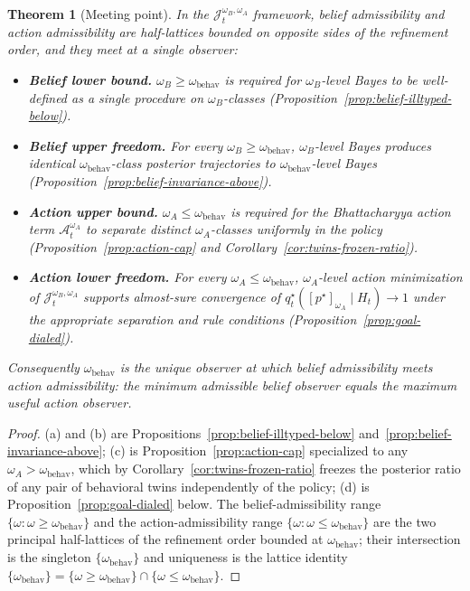 \documentclass[11pt]{article}
\newtheorem{theorem}{Theorem}[section]
\theoremstyle{definition}
\theoremstyle{remark}
\begin{document}
\begin{theorem}[Meeting point]
\label{thm:meeting-point}
In the $\mathcal J_t^{\omega_B,\omega_A}$ framework, belief admissibility and action admissibility are half-lattices bounded on opposite sides of the refinement order, and they meet at a single observer:
\begin{itemize}
\item[(a)] \textbf{Belief lower bound.} $\omega_B\ge\omega_{\mathrm{behav}}$ is required for $\omega_B$-level Bayes to be well-defined as a single procedure on $\omega_B$-classes (Proposition~\ref{prop:belief-illtyped-below}).
\item[(b)] \textbf{Belief upper freedom.} For every $\omega_B\ge\omega_{\mathrm{behav}}$, $\omega_B$-level Bayes produces identical $\omega_{\mathrm{behav}}$-class posterior trajectories to $\omega_{\mathrm{behav}}$-level Bayes (Proposition~\ref{prop:belief-invariance-above}).
\item[(c)] \textbf{Action upper bound.} $\omega_A\le\omega_{\mathrm{behav}}$ is required for the Bhattacharyya action term $\mathcal A_t^{\omega_A}$ to separate distinct $\omega_A$-classes uniformly in the policy (Proposition~\ref{prop:action-cap} and Corollary~\ref{cor:twins-frozen-ratio}).
\item[(d)] \textbf{Action lower freedom.} For every $\omega_A\le\omega_{\mathrm{behav}}$, $\omega_A$-level action minimization of $\mathcal J_t^{\omega_B,\omega_A}$ supports almost-sure convergence of $q_t^\star([p^\star]_{\omega_A}\mid H_t)\to 1$ under the appropriate separation and rule conditions (Proposition~\ref{prop:goal-dialed}).
\end{itemize}
Consequently $\omega_{\mathrm{behav}}$ is the unique observer at which belief admissibility meets action admissibility: the minimum admissible belief observer equals the maximum useful action observer.
\end{theorem}

\begin{proof}
(a) and (b) are Propositions~\ref{prop:belief-illtyped-below} and~\ref{prop:belief-invariance-above}; (c) is Proposition~\ref{prop:action-cap} specialized to any $\omega_A>\omega_{\mathrm{behav}}$, which by Corollary~\ref{cor:twins-frozen-ratio} freezes the posterior ratio of any pair of behavioral twins independently of the policy; (d) is Proposition~\ref{prop:goal-dialed} below. The belief-admissibility range $\{\omega:\omega\ge\omega_{\mathrm{behav}}\}$ and the action-admissibility range $\{\omega:\omega\le\omega_{\mathrm{behav}}\}$ are the two principal half-lattices of the refinement order bounded at $\omega_{\mathrm{behav}}$; their intersection is the singleton $\{\omega_{\mathrm{behav}}\}$ and uniqueness is the lattice identity $\{\omega_{\mathrm{behav}}\}=\{\omega\ge\omega_{\mathrm{behav}}\}\cap\{\omega\le\omega_{\mathrm{behav}}\}$.
\end{proof}
\end{document}
